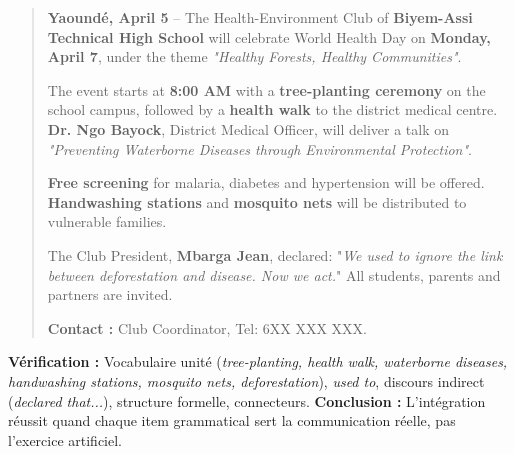 \documentclass[11pt]{article}
\begin{document}
\begin{exoresolu}
\begin{quote}
\textbf{Yaoundé, April 5} -- The Health-Environment Club of \textbf{Biyem-Assi Technical High School} will celebrate World Health Day on \textbf{Monday, April 7}, under the theme \emph{"Healthy Forests, Healthy Communities"}.

The event starts at \textbf{8:00 AM} with a \textbf{tree-planting ceremony} on the school campus, followed by a \textbf{health walk} to the district medical centre. \textbf{Dr. Ngo Bayock}, District Medical Officer, will deliver a talk on \emph{"Preventing Waterborne Diseases through Environmental Protection"}.

\textbf{Free screening} for malaria, diabetes and hypertension will be offered. \textbf{Handwashing stations} and \textbf{mosquito nets} will be distributed to vulnerable families.

The Club President, \textbf{Mbarga Jean}, declared: "\emph{We used to ignore the link between deforestation and disease. Now we act.}" All students, parents and partners are invited.

\textbf{Contact :} Club Coordinator, Tel: 6XX XXX XXX.
\end{quote}

\textbf{Vérification :} Vocabulaire unité (\emph{tree-planting, health walk, waterborne diseases, handwashing stations, mosquito nets, deforestation}), \emph{used to}, discours indirect (\emph{declared that...}), structure formelle, connecteurs. \textbf{Conclusion :} L'intégration réussit quand chaque item grammatical sert la communication réelle, pas l'exercice artificiel.
\end{exoresolu}
\end{document}
